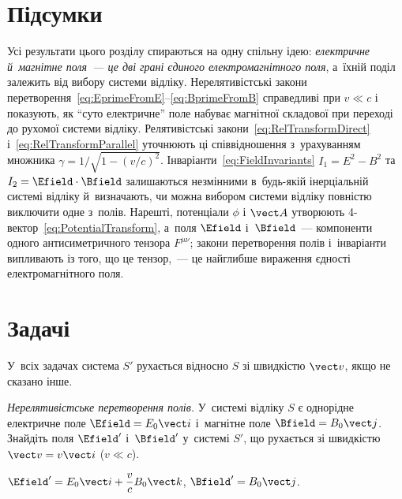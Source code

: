\section*{Підсумки}
 {}

Усі результати цього розділу спираються на одну спільну ідею: \emph{електричне й~магнітне
поля~--- це дві грані єдиного електромагнітного поля}, а~їхній поділ залежить від вибору
системи відліку. Нерелятивістські закони
перетворення~\eqref{eq:EprimeFromE}--\eqref{eq:BprimeFromB} справедливі при $v \ll c$ і
показують, як \enquote{суто електричне} поле набуває магнітної складової при переході до рухомої
системи відліку. Релятивістські закони~\eqref{eq:RelTransformDirect} і~\eqref{eq:RelTransformParallel} уточнюють ці
співвідношення з~урахуванням множника $\gamma = 1/\sqrt{1-(v/c)^2}$.
Інваріанти~\eqref{eq:FieldInvariants} $I_1 = E^2 - B^2$ та $I_2 = \Efield\cdot\Bfield$
залишаються незмінними в~будь-якій інерціальній системі відліку й~визначають, чи можна
вибором системи відліку повністю виключити одне з~полів. Нарешті, потенціали $\phi$ і
$\vect A$ утворюють 4-вектор~\eqref{eq:PotentialTransform}, а~поля $\Efield$ і~$\Bfield$~--- компоненти одного антисиметричного
тензора $F^{\mu\nu}$; закони перетворення полів і~інваріанти випливають із того, що це тензор,~--- це найглибше вираження
єдності електромагнітного поля.

\section*{Задачі}
 {}

У~всіх задачах система $S'$ рухається відносно $S$ зі швидкістю $\vect v$, якщо не сказано
інше.


\begin{problem}\label{prb:FieldTransformNonRel}
	\emph{Нерелятивістське перетворення полів.} У~системі відліку $S$ є однорідне
	електричне поле $\Efield = E_0\vect i$ і~магнітне поле $\Bfield = B_0\vect j$.
	Знайдіть поля $\Efield'$ і~$\Bfield'$ у~системі $S'$, що рухається зі швидкістю $\vect
	v = v\vect i$ ($v \ll c$).
	\begin{solution}
		$\Efield' = E_0\vect i + \dfrac{v}{c}B_0\vect k$, $\Bfield' = B_0\vect j$.
	\end{solution}
\end{problem}


